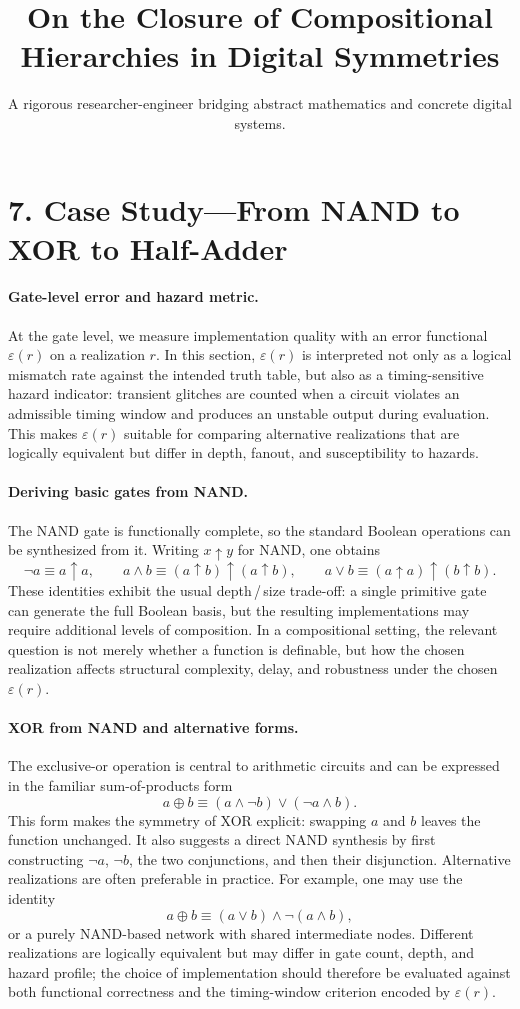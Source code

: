 \documentclass[11pt]{article}
\title{On the Closure of Compositional Hierarchies in Digital Symmetries}
\author{A rigorous researcher-engineer bridging abstract mathematics and concrete digital systems.}
\begin{document}
\section*{7. Case Study—From NAND to XOR to Half-Adder}

\paragraph{Gate-level error and hazard metric.}
At the gate level, we measure implementation quality with an error functional \(\varepsilon(r)\) on a realization \(r\). In this section, \(\varepsilon(r)\) is interpreted not only as a logical mismatch rate against the intended truth table, but also as a timing-sensitive hazard indicator: transient glitches are counted when a circuit violates an admissible timing window and produces an unstable output during evaluation. This makes \(\varepsilon(r)\) suitable for comparing alternative realizations that are logically equivalent but differ in depth, fanout, and susceptibility to hazards.

\paragraph{Deriving basic gates from NAND.}
The NAND gate is functionally complete, so the standard Boolean operations can be synthesized from it. Writing \(x \uparrow y\) for NAND, one obtains
\[
\neg a \equiv a \uparrow a,
\qquad
 a \wedge b \equiv (a \uparrow b) \uparrow (a \uparrow b),
\qquad
 a \vee b \equiv (a \uparrow a) \uparrow (b \uparrow b).
\]
These identities exhibit the usual depth\,/\,size trade-off: a single primitive gate can generate the full Boolean basis, but the resulting implementations may require additional levels of composition. In a compositional setting, the relevant question is not merely whether a function is definable, but how the chosen realization affects structural complexity, delay, and robustness under the chosen \(\varepsilon(r)\).

\paragraph{XOR from NAND and alternative forms.}
The exclusive-or operation is central to arithmetic circuits and can be expressed in the familiar sum-of-products form
\[
 a \oplus b \equiv (a \wedge \neg b) \vee (\neg a \wedge b).
\]
This form makes the symmetry of XOR explicit: swapping \(a\) and \(b\) leaves the function unchanged. It also suggests a direct NAND synthesis by first constructing \(\neg a\), \(\neg b\), the two conjunctions, and then their disjunction. Alternative realizations are often preferable in practice. For example, one may use the identity
\[
 a \oplus b \equiv (a \vee b) \wedge \neg(a \wedge b),
\]
or a purely NAND-based network with shared intermediate nodes. Different realizations are logically equivalent but may differ in gate count, depth, and hazard profile; the choice of implementation should therefore be evaluated against both functional correctness and the timing-window criterion encoded by \(\varepsilon(r)\).
\end{document}
